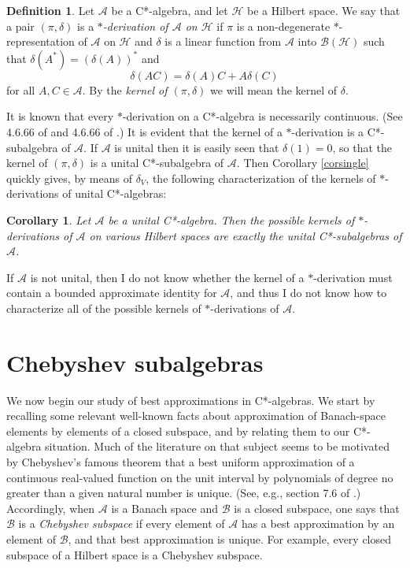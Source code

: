 \documentclass[12pt]{amsart}
\newcommand{\<}{\langle}
\renewcommand{\>}{\rangle}
\renewcommand{\d}{\delta}
\newcommand{\cA}{{\mathcal A}}
\newcommand{\cB}{{\mathcal B}}
\newcommand{\cH}{{\mathcal H}}
\newtheorem{corollary}[theorem]{Corollary}
\theoremstyle{definition}   %
\newtheorem{definition}[theorem]{Definition}
\begin{document}
\begin{definition}
Let $\cA$ be a C*-algebra, and let $\cH$ be a Hilbert space. 
We say that a pair $(\pi, \d)$ is a \emph{$*$-derivation of $\cA$ on $\cH$}
if $\pi$ is a non-degenerate $*$-representation of $\cA$ on $\cH$
and $\d$ is a linear function from $\cA$ into $\cB(\cH)$ such that
$\d(A^*) = (\d(A))^*$ and 
\[
\d(AC) = \d(A)C + A\d(C)
\]
for all $A, C \in \cA$.
By the \emph{kernel of $(\pi, \d)$} we will mean the kernel of $\d$.
\end{definition}

It is known that every $*$-derivation on a C*-algebra is necessarily
continuous. (See 4.6.66 of \cite{KR1} and  4.6.66 of \cite{KR3}.)
It is evident that the kernel of a $*$-derivation 
is a C*-subalgebra of $\cA$. If $\cA$ is
unital then it is easily seen that $\d(1) = 0$, so that the kernel
of $(\pi, \d)$ is a unital C*-subalgebra of $\cA$. Then Corollary
\ref{corsingle} quickly gives, by means of $\d_V$, the following characterization of the kernels
of $*$-derivations of unital C*-algebras:

\begin{corollary}
Let $\cA$ be a unital C*-algebra. Then the possible kernels of
$*$-derivations of $\cA$ on various Hilbert spaces are exactly the
unital C*-subalgebras of $\cA$.
\end{corollary}  

If $\cA$ is not unital, then I do not know whether the kernel of
a $*$-derivation must contain a bounded approximate identity
for $\cA$, and thus I do not know how to characterize all of the
possible kernels of $*$-derivations of $\cA$.


\section{Chebyshev subalgebras}
\label{sec2}

We now begin our study of best approximations in C*-algebras. We start  by recalling some relevant well-known facts about
approximation of Banach-space elements by elements of
a closed subspace, and by relating them to our C*-algebra situation.
Much of the literature on that subject seems to be motivated by
Chebyshev's famous theorem that a best uniform approximation of a continuous
real-valued function on the unit interval by polynomials of degree no 
greater than a given natural number is unique. (See, e.g., section 7.6 of \cite{Dvs}.)
Accordingly, when
$\cA$ is a Banach space and $\cB$ is a closed subspace, one says
that $\cB$ is a \emph{Chebyshev subspace} if every element of $\cA$
has a best approximation by an element of $\cB$, and that best
approximation is unique. For example, every closed subspace
of a Hilbert space is a Chebyshev subspace.
\end{document}
